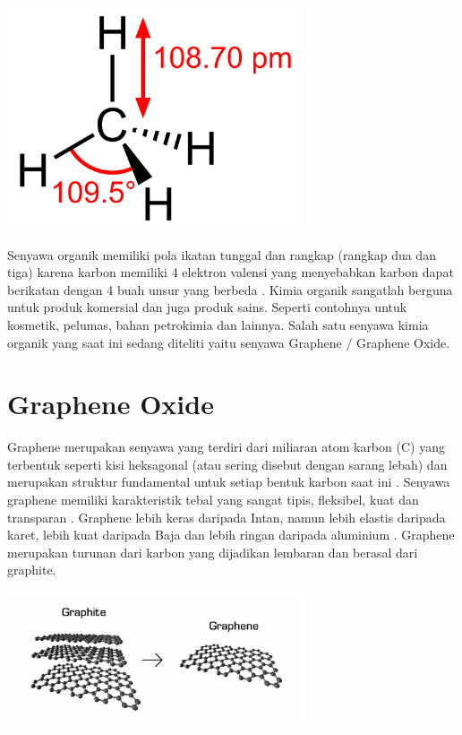 \documentclass[12pt,a4paper]{report}
\begin{document}
	\begin{center}
		\includegraphics[width=8.75cm]{gambar/metana.png}
	\end{center}

	Senyawa organik memiliki pola ikatan tunggal dan rangkap (rangkap dua dan tiga) karena karbon memiliki 4 elektron valensi yang menyebabkan karbon dapat berikatan dengan 4 buah unsur yang berbeda \cite{Clayden2012}. Kimia organik sangatlah berguna untuk produk komersial dan juga produk sains. Seperti contohnya untuk kosmetik, pelumas, bahan petrokimia dan lainnya. Salah satu senyawa kimia organik yang saat ini sedang diteliti yaitu senyawa Graphene / Graphene Oxide.
	
	\section{Graphene Oxide}
	Graphene merupakan senyawa yang terdiri dari miliaran atom karbon (C) yang terbentuk seperti kisi heksagonal (atau sering disebut dengan sarang lebah) dan merupakan struktur fundamental untuk setiap bentuk karbon saat ini \cite{Clemons2010}. Senyawa graphene memiliki karakteristik tebal yang sangat tipis, fleksibel, kuat dan transparan \cite{Ni2015}. Graphene lebih keras daripada Intan, namun lebih elastis daripada karet, lebih kuat daripada Baja dan lebih ringan daripada aluminium \cite{Berger2019}. Graphene merupakan turunan dari karbon yang dijadikan lembaran dan berasal dari graphite.
	
	\begin{center}
		\includegraphics[width=8.75cm]{gambar/grafit.png}
	\end{center}
	
\end{document}
